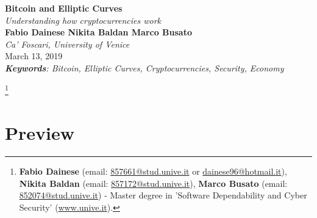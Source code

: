 \documentclass{article}
\begin{document}
\begin{titlepage}
    \begin{center}
      \vspace{1.5cm}\Huge\textbf{Bitcoin and Elliptic Curves}\\
      \LARGE\textit{Understanding how cryptocurrencies work}\\
      \vspace{2cm}\Large\textbf{Fabio Dainese \hfill Nikita Baldan \hfill Marco Busato}\\
      \vspace{0.75cm}\Large\textit{Ca’ Foscari, University of Venice}\\
      \vspace{0.75cm}\Large March 13, 2019\\
      \vspace{2cm}\large\textit{\textbf{Keywords}: Bitcoin, Elliptic Curves, Cryptocurrencies, Security, Economy}
   \end{center}
   \let\thefootnote\relax\footnote{\textbf{Fabio Dainese} (email: \href{mailto:857661@stud.unive.it}{857661@stud.unive.it} or \href{mailto:dainese96@hotmail.it}{dainese96@hotmail.it}), \textbf{Nikita Baldan} (email: \href{mailto:857172@stud.unive.it}{857172@stud.unive.it}), \textbf{Marco Busato} (email: \href{mailto:852074@stud.unive.it}{852074@stud.unive.it}) - Master degree in 'Software Dependability and Cyber Security' (\href{www.unive.it}{www.unive.it}).}
\end{titlepage}

\section*{Preview}
\end{document}
